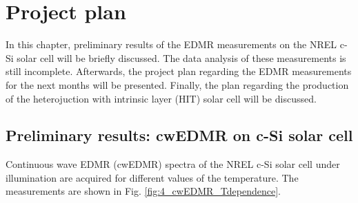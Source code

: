 \documentclass[a4paper]{book}
\newcommand{\tsub}{\textsubscript}
\begin{document}
	
	
	\chapter{Project plan}
	In this chapter, preliminary results of the EDMR measurements on the NREL c-Si solar cell will be briefly discussed. The data analysis of these measurements is still incomplete. Afterwards, the project plan regarding the EDMR measurements for the next months will be presented. Finally, the plan regarding the production of the heterojuction with intrinsic layer (HIT) solar cell will be discussed.
	
	\section{Preliminary results: cwEDMR on c-Si solar cell}
	Continuous wave EDMR (cwEDMR) spectra of the NREL c-Si solar cell under illumination are acquired for different values of the temperature. The measurements are shown in Fig. \ref{fig:4_cwEDMR_Tdependence}.
	
\end{document}

